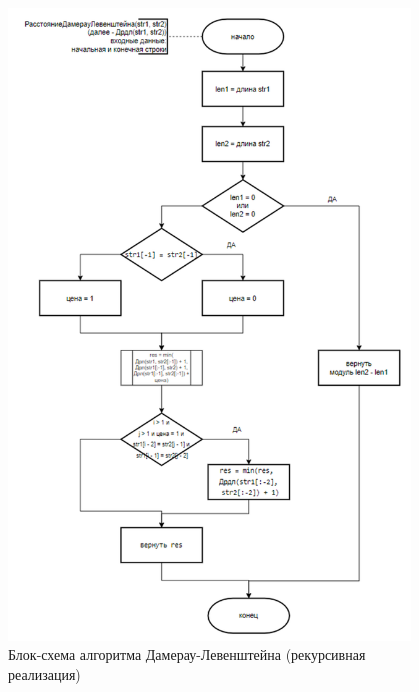 \begin{figure}[H]
    \centering
    \includegraphics[width=0.95\textwidth]{img/block_2_2.png}
    \caption{Блок-схема алгоритма Дамерау-Левенштейна (рекурсивная реализация)}
\end{figure}

